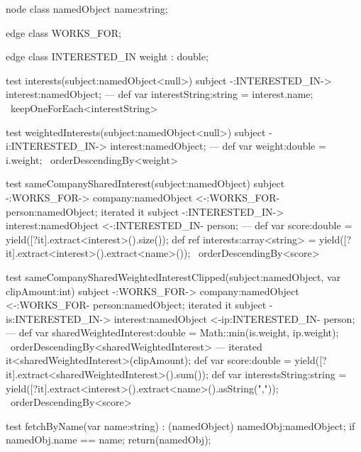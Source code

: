 \begin{example}

  \begin{grgen}
node class namedObject
{
	name:string;
}

edge class WORKS_FOR;

edge class INTERESTED_IN
{
	weight : double;
}
  \end{grgen}

  \begin{grgen}
test interests(subject:namedObject<null>)
{
	subject -:INTERESTED_IN-> interest:namedObject;
---
	def var interestString:string = interest.name;
} \ keepOneForEach<interestString>

test weightedInterests(subject:namedObject<null>)
{
	subject -i:INTERESTED_IN-> interest:namedObject;
---
	def var weight:double = i.weight;
} \ orderDescendingBy<weight>

test sameCompanySharedInterest(subject:namedObject)
{
	subject -:WORKS_FOR-> company:namedObject <-:WORKS_FOR- person:namedObject;
	iterated it {
		subject -:INTERESTED_IN-> interest:namedObject <-:INTERESTED_IN- person;
	}
---
	def var score:double = yield([?it].extract<interest>().size());
	def ref interests:array<string> = yield([?it].extract<interest>().extract<name>());
} \ orderDescendingBy<score>

test sameCompanySharedWeightedInterestClipped(subject:namedObject, var clipAmount:int)
{
	subject -:WORKS_FOR-> company:namedObject <-:WORKS_FOR- person:namedObject;
	iterated it {
		subject -is:INTERESTED_IN-> interest:namedObject <-ip:INTERESTED_IN- person;
	---
		def var sharedWeightedInterest:double = Math::min(is.weight, ip.weight);
	} \ orderDescendingBy<sharedWeightedInterest>
---
	iterated it\orderDescendingBy<sharedWeightedInterest>\keepFirst(clipAmount);
	def var score:double = yield([?it].extract<sharedWeightedInterest>().sum());
	def var interestsString:string = yield([?it].extract<interest>().extract<name>().asString(","));
} \ orderDescendingBy<score>

test fetchByName(var name:string) : (namedObject)
{
	namedObj:namedObject;
	if{ namedObj.name == name; }
	return(namedObj);
}
  \end{grgen}\label{exsimplequeryrules}
\end{example}


